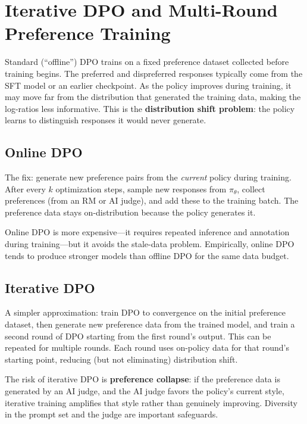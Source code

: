 \section{Iterative DPO and Multi-Round Preference Training}
\label{sec:iterative-dpo}

Standard (``offline'') DPO trains on a fixed preference dataset collected before training begins. The preferred and dispreferred responses typically come from the SFT model or an earlier checkpoint. As the policy improves during training, it may move far from the distribution that generated the training data, making the log-ratios less informative. This is the \textbf{distribution shift problem}: the policy learns to distinguish responses it would never generate.

\subsection{Online DPO}

The fix: generate new preference pairs from the \emph{current} policy during training. After every $k$ optimization steps, sample new responses from $\pi_\theta$, collect preferences (from an RM or AI judge), and add these to the training batch. The preference data stays on-distribution because the policy generates it.

Online DPO is more expensive---it requires repeated inference and annotation during training---but it avoids the stale-data problem. Empirically, online DPO tends to produce stronger models than offline DPO for the same data budget.

\subsection{Iterative DPO}

A simpler approximation: train DPO to convergence on the initial preference dataset, then generate new preference data from the trained model, and train a second round of DPO starting from the first round's output. This can be repeated for multiple rounds. Each round uses on-policy data for that round's starting point, reducing (but not eliminating) distribution shift.

The risk of iterative DPO is \textbf{preference collapse}: if the preference data is generated by an AI judge, and the AI judge favors the policy's current style, iterative training amplifies that style rather than genuinely improving. Diversity in the prompt set and the judge are important safeguards.

